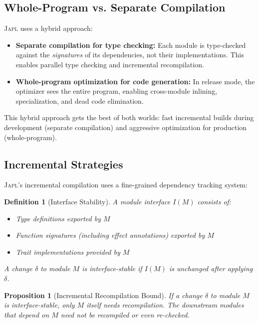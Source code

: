\documentclass[11pt,twocolumn]{article}
\newtheorem{proposition}[theorem]{Proposition}
\newtheorem{definition}[theorem]{Definition}
\newcommand{\japl}{\textsc{Japl}}
\begin{document}
\subsection{Whole-Program vs. Separate Compilation}

\japl{} uses a hybrid approach:

\begin{itemize}[leftmargin=*]
\item \textbf{Separate compilation for type checking:} Each module is type-checked against the \emph{signatures} of its dependencies, not their implementations. This enables parallel type checking and incremental recompilation.
\item \textbf{Whole-program optimization for code generation:} In release mode, the optimizer sees the entire program, enabling cross-module inlining, specialization, and dead code elimination.
\end{itemize}

This hybrid approach gets the best of both worlds: fast incremental builds during development (separate compilation) and aggressive optimization for production (whole-program).

\subsection{Incremental Strategies}

\japl{}'s incremental compilation uses a fine-grained dependency tracking system:

\begin{definition}[Interface Stability]
A module interface $I(M)$ consists of:
\begin{itemize}
\item Type definitions exported by $M$
\item Function signatures (including effect annotations) exported by $M$
\item Trait implementations provided by $M$
\end{itemize}
A change $\delta$ to module $M$ is \emph{interface-stable} if $I(M)$ is unchanged after applying $\delta$.
\end{definition}

\begin{proposition}[Incremental Recompilation Bound]
If a change $\delta$ to module $M$ is interface-stable, only $M$ itself needs recompilation.
The downstream modules that depend on $M$ need not be recompiled or even re-checked.
\end{proposition}
\end{document}
